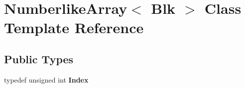 \hypertarget{class_numberlike_array}{}\section{Numberlike\+Array$<$ Blk $>$ Class Template Reference}
\label{class_numberlike_array}
\subsection*{Public Types}
\begin{DoxyCompactItemize}
\item 
\mbox{\label{class_numberlike_array_a7ad8506727ac4e2f4c7850cc41f4142c}} 
typedef unsigned int {\bfseries Index}
\end{DoxyCompactItemize}
